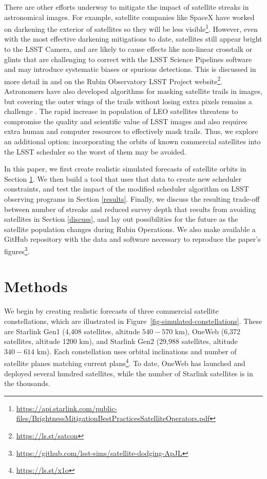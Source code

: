 \documentclass[twocolumn]{aastex631}
\begin{document}
There are other efforts underway to mitigate the impact of satellite streaks in astronomical images. For example, satellite companies like SpaceX have worked on darkening the exterior of satellites so they will be less visible\footnote{\url{https://api.starlink.com/public-files/BrightnessMitigationBestPracticesSatelliteOperators.pdf}}. However, even with the most effective darkening mitigations to date, satellites still appear bright to the LSST Camera, and are likely to cause effects like non-linear crosstalk or glints that are challenging to correct with the LSST Science Pipelines software and may introduce systematic biases or spurious detections. This is discussed in more detail in \citet{tyson20} and on the Rubin Observatory LSST Project website\footnote{\url{https://ls.st/satcon}}. Astronomers have also developed algorithms for masking satellite trails in images, but covering the outer wings of the trails without losing extra pixels remains a challenge \citep{hasan22}. The rapid increase in population of LEO satellites threatens to compromise the quality and scientific value of LSST images and also requires extra human and computer resources to effectively mask trails. Thus, we explore an additional option: incorporating the orbits of known commercial satellites into the LSST scheduler so the worst of them may be avoided.

In this paper, we first create realistic simulated forecasts of satellite orbits in Section \ref{method}. We then build a tool that uses that data to create new scheduler constraints, and test the impact of the modified scheduler algorithm on LSST observing programs in Section \ref{results}. Finally, we discuss the resulting trade-off between number of streaks and reduced survey depth that results from avoiding satellites in Section \ref{discuss}, and lay out possibilities for the future as the satellite population changes during Rubin Operations. We also make available a GitHub repository with the data and software necessary to reproduce the paper's figures\footnote{\url{https://github.com/lsst-sims/satellite-dodging-ApJL}}.


\section{Methods}\label{method}

We begin by creating realistic forecasts of three commercial satellite constellations, which are illustrated in Figure~\ref{fig-simulated-constellations}. These are Starlink Gen1 (4,408 satellites, altitude $540-570$ km), OneWeb (6,372 satellites, altitude 1200 km), and Starlink Gen2 (29,988 satellites, altitude $340-614$ km). Each constellation uses orbital inclinations and number of satellite planes matching current plans\footnote{\url{https://ls.st/x1o}}. To date, OneWeb has launched and deployed several hundred satellites, while the number of Starlink satellites is in the thousands.
\end{document}
